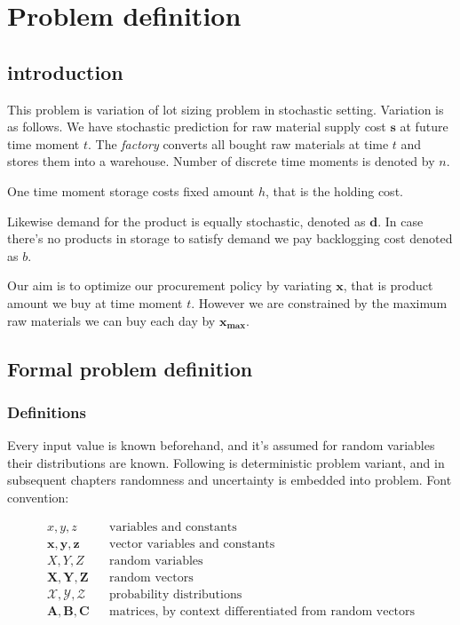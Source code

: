 
\chapter{Problem definition}
\section{introduction}

This problem is variation of lot sizing problem in stochastic setting. Variation is as follows. We have stochastic prediction for raw material supply cost $\mathbf{s}$ at future time moment $t$. The \emph{factory} converts all bought raw materials at time $t$ and stores them into a warehouse. Number of discrete time moments is denoted by $n$.

One time moment storage costs fixed amount $h$, that is the holding cost.

Likewise demand for the product is equally stochastic, denoted as $\mathbf{d}$. In case there's no products in storage to satisfy demand we pay backlogging cost denoted as $b$.

Our aim is to optimize our procurement policy by variating $\mathbf{x}$, that is product amount we buy at time moment $t$. However we are constrained by the maximum raw materials we can buy each day by $\mathbf{x_{\text{max}}}$.

\section{Formal problem definition}
\label{sec:Formal problem definition}

\subsection{Definitions}
\label{sub:Definitions}

Every input value is known beforehand, and it's assumed for random variables their distributions are known. Following is deterministic problem variant, and in subsequent chapters randomness and uncertainty is embedded into problem. Font convention:

\begin{align*}
x, y, z && \text{variables and constants} \\
\mathbf{x, y, z} && \text{vector variables and constants} \\
X, Y, Z && \text{random variables} \\
\mathbf{X, Y, Z} && \text{random vectors} \\
\mathcal{X, Y, Z} && \text{probability distributions} \\
\mathbf{A, B, C} && \text{matrices, by context differentiated from random vectors}
\end{align*}

